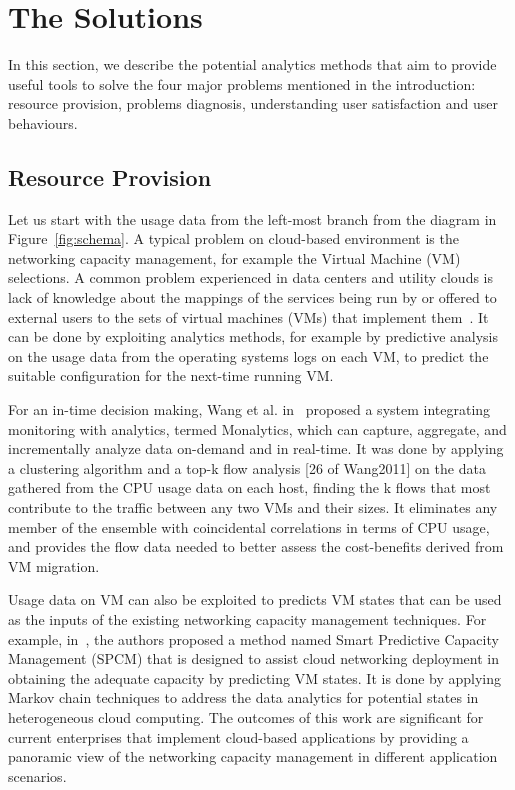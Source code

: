 \section{The Solutions}
In this section, we describe the potential analytics methods that aim to provide useful tools to solve the four major problems mentioned in the introduction: resource provision, problems diagnosis, understanding user satisfaction and user behaviours.

\subsection{Resource Provision}
Let us start with the usage data from the left-most branch from the diagram in Figure~\ref{fig:schema}. A typical problem on cloud-based environment is the networking capacity management, for example the Virtual Machine (VM) selections. A common problem experienced in data centers and utility clouds is lack of knowledge about the mappings of the services being run by or offered to external users to the sets of virtual machines (VMs) that implement them~\cite{Wang2011}. It can be done by exploiting analytics methods, for example by predictive analysis on the usage data from the operating systems logs on each VM, to predict the suitable configuration for the next-time running VM.   

For an in-time decision making, Wang et al. in~\cite{Wang2011} proposed a system integrating monitoring with analytics, termed Monalytics, which can capture, aggregate, and incrementally analyze data on-demand and in real-time. It was done by applying a clustering algorithm and a top-k flow analysis [26 of Wang2011] on the data gathered from the CPU usage data on each host, finding the k flows that most contribute to the traffic between any two VMs and their sizes. It eliminates any member of the ensemble with coincidental correlations in terms of CPU usage, and provides the flow data needed to better assess the cost-benefits derived from VM migration.
 
 Usage data on VM can also be exploited to predicts VM states that can be used as the inputs of the existing networking capacity management techniques. For example, in~\cite{Sun2016}, the authors proposed a method named Smart Predictive Capacity Management (SPCM) that is designed to assist cloud networking deployment in obtaining the adequate capacity by predicting VM states. It is done by applying Markov chain techniques to address the data analytics for potential states in heterogeneous cloud computing. The outcomes of this work are significant for current enterprises that implement cloud-based applications by providing a panoramic view of the networking capacity management in different application scenarios.
 

